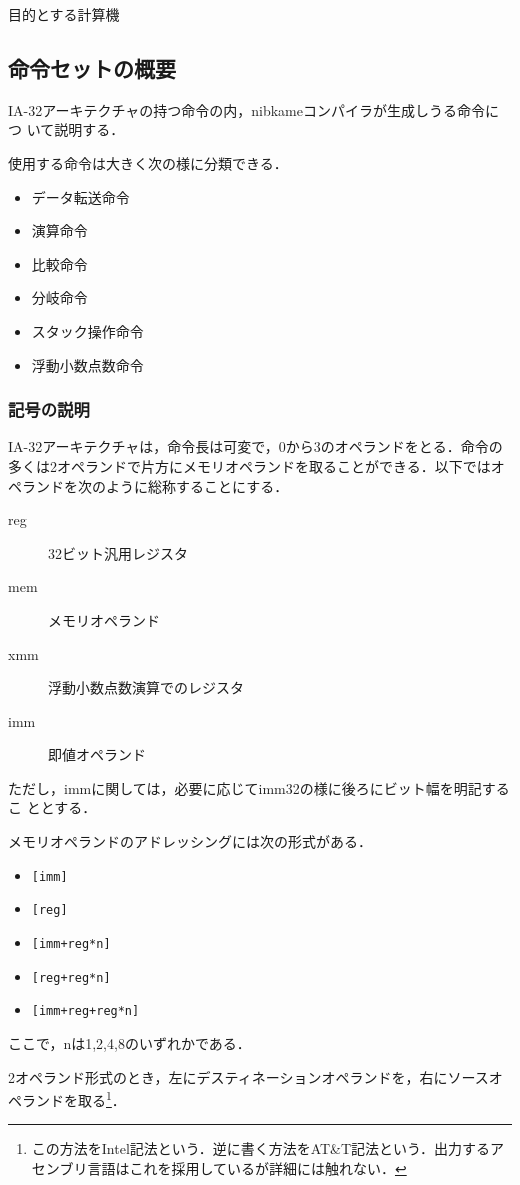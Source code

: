 \documentclass[a4paper,titlepage,report]{jsbook}
\begin{document}
\begin{resbonsiblesection}{目的とする計算機}{\kobori}
\subsection{命令セットの概要}
IA-32アーキテクチャの持つ命令の内，nibkameコンパイラが生成しうる命令につ
いて説明する．

使用する命令は大きく次の様に分類できる．
\begin{itemize}
 \item データ転送命令
 \item 演算命令
 \item 比較命令
 \item 分岐命令
 \item スタック操作命令
 \item 浮動小数点数命令
\end{itemize}

\subsubsection{記号の説明}
IA-32アーキテクチャは，命令長は可変で，0から3のオペランドをとる．命令の
多くは2オペランドで片方にメモリオペランドを取ることができる．以下ではオ
ペランドを次のように総称することにする．
\begin{description}
 \item[reg] 32ビット汎用レジスタ
 \item[mem] メモリオペランド
 \item[xmm] 浮動小数点数演算でのレジスタ
 \item[imm] 即値オペランド
\end{description}
ただし，immに関しては，必要に応じてimm32の様に後ろにビット幅を明記するこ
ととする．

メモリオペランドのアドレッシングには次の形式がある．
\begin{itemize}
 \item \lstinline|[imm]|
 \item \lstinline|[reg]|
 \item \lstinline|[imm+reg*n]|
 \item \lstinline|[reg+reg*n]|
 \item \lstinline|[imm+reg+reg*n]|
\end{itemize}
ここで，nは1,2,4,8のいずれかである．

2オペランド形式のとき，左にデスティネーションオペランドを，右にソースオ
ペランドを取る\footnote{この方法をIntel記法という．逆に書く方法をAT\&T記法という．出力するアセンブリ言語はこれを採用しているが詳細には触れない．}．


\end{resbonsiblesection}
\end{document}
